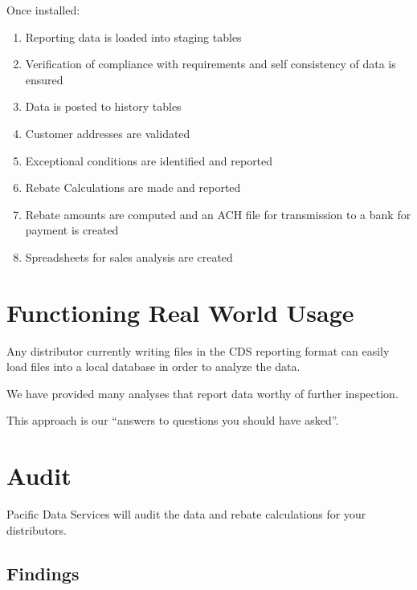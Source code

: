 \documentclass[letterpaper,10pt,english]{sphinxmanual}
\begin{document}
Once installed:
\begin{enumerate}
%
\item {} 
Reporting data is loaded into staging tables

\item {} 
Verification of compliance with requirements and self consistency of data is ensured

\item {} 
Data is posted to history tables

\item {} 
Customer addresses are validated

\item {} 
Exceptional conditions are identified and reported

\item {} 
Rebate Calculations are made and reported

\item {} 
Rebate amounts are computed and an ACH file for transmission to a bank for payment is created

\item {} 
Spreadsheets for sales analysis are created

\end{enumerate}


\chapter{Functioning Real World Usage}
\label{\detokenize{index:functioning-real-world-usage}}
Any distributor currently writing files in the CDS reporting format can easily load files
into a local database in order to analyze the data.

We have provided many analyses that report data worthy of further inspection.

This approach is our “answers to questions you should have asked”.


\chapter{Audit}
\label{\detokenize{index:audit}}
Pacific Data Services will audit the data and rebate calculations for your distributors.


\section{Findings}
\label{\detokenize{index:findings}}
\end{document}
